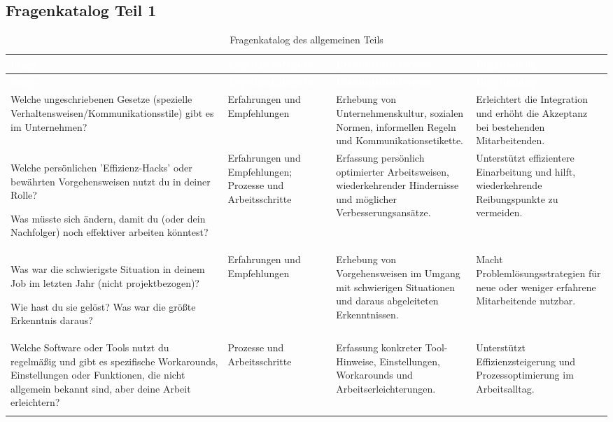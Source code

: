 \documentclass[
  10pt,
  ngerman,
  a4paper,
  toc=graduated,
  numbers=noenddot,
  headings=standardclasses,
  nonumberlist
]{scrartcl}
\renewcommand{\arraystretch}{1.0}
\begin{document}
\clearpage
\subsection{Fragenkatalog Teil 1}
\label{anhang_fragenkatalog_1}

\setlength{\tabcolsep}{3.5pt}
\renewcommand{\arraystretch}{1.0}

\begin{longtable}{|L{4.9cm}|L{3.1cm}|L{3.8cm}|L{3.3cm}|}
\hline
{}
\textcolor{white}{\textbf{Frage}} &
\textcolor{white}{\textbf{Ergebniskategorie}} &
\textcolor{white}{\textbf{Erkenntnisinteresse}} &
\textcolor{white}{\textbf{Begründung}} \\
\hline
\endfirsthead

\hline
{}
\textcolor{white}{\textbf{Frage}} &
\textcolor{white}{\textbf{Ergebniskategorie}} &
\textcolor{white}{\textbf{Erkenntnisinteresse}} &
\textcolor{white}{\textbf{Begründung}} \\
\hline
\endhead

Welche ungeschriebenen Gesetze (spezielle Verhaltensweisen/Kommunikationsstile) gibt es im Unternehmen?
& Erfahrungen und Empfehlungen
& Erhebung von Unternehmenskultur, sozialen Normen, informellen Regeln und Kommunikationsetikette.
& Erleichtert die Integration und erhöht die Akzeptanz bei bestehenden Mitarbeitenden. \\
\hline

Welche persönlichen 'Effizienz-Hacks' oder bewährten Vorgehensweisen nutzt du in deiner Rolle?

Was müsste sich ändern, damit du (oder dein Nachfolger) noch effektiver arbeiten könntest?
& Erfahrungen und Empfehlungen; Prozesse und Arbeitsschritte
& Erfassung persönlich optimierter Arbeitsweisen, wiederkehrender Hindernisse und möglicher Verbesserungsansätze.
& Unterstützt effizientere Einarbeitung und hilft, wiederkehrende Reibungspunkte zu vermeiden. \\
\hline

Was war die schwierigste Situation in deinem Job im letzten Jahr (nicht projektbezogen)? 

Wie hast du sie gelöst? Was war die größte Erkenntnis daraus?
& Erfahrungen und Empfehlungen
& Erhebung von Vorgehensweisen im Umgang mit schwierigen Situationen und daraus abgeleiteten Erkenntnissen.
& Macht Problemlösungsstrategien für neue oder weniger erfahrene Mitarbeitende nutzbar. \\
\hline

Welche Software oder Tools nutzt du regelmäßig und gibt es spezifische Workarounds, Einstellungen oder Funktionen, die nicht allgemein bekannt sind, aber deine Arbeit erleichtern?
& Prozesse und Arbeitsschritte
& Erfassung konkreter Tool-Hinweise, Einstellungen, Workarounds und Arbeitserleichterungen.
& Unterstützt Effizienzsteigerung und Prozessoptimierung im Arbeitsalltag. \\
\hline
\caption{Fragenkatalog des allgemeinen Teils}
\label{tab:fragenkatalog_teil_1}
\end{longtable}
\end{document}
